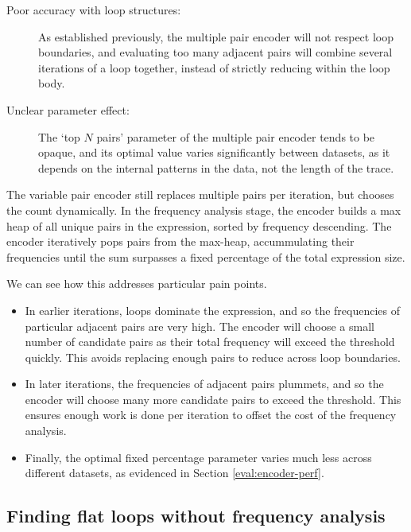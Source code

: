 \begin{description}
  \item[Poor accuracy with loop structures:] As established previously, the multiple pair encoder will not respect 
    loop boundaries, and evaluating too many adjacent pairs will combine several iterations of a loop together, instead 
    of strictly reducing within the loop body.
  \item [Unclear parameter effect:] The `top $N$ pairs' parameter of the multiple pair encoder tends to be opaque, and 
    its optimal value varies significantly between datasets, as it depends on the internal patterns in the data, not 
    the length of the trace.
\end{description}

The variable pair encoder still replaces multiple pairs per iteration, but chooses the count dynamically. In the 
frequency analysis stage, the encoder builds a max heap of all unique pairs in the expression, sorted by frequency 
descending. The encoder iteratively pops pairs from the max-heap, accummulating their frequencies until the sum 
surpasses a fixed percentage of the total expression size.

We can see how this addresses particular pain points.

\begin{itemize}
  \item In earlier iterations, loops dominate the expression, and so the frequencies of particular adjacent pairs are
    very high. The encoder will choose a small number of candidate pairs as their total frequency will exceed the
    threshold quickly. This avoids replacing enough pairs to reduce across loop boundaries.
  \item In later iterations, the frequencies of adjacent pairs plummets, and so the encoder will choose many more 
    candidate pairs to exceed the threshold. This ensures enough work is done per iteration to offset the cost of the 
    frequency analysis.
  \item Finally, the optimal fixed percentage parameter varies much less across different datasets, as evidenced in Section \ref{eval:encoder-perf}.
\end{itemize}

\subsection{Finding flat loops without frequency analysis} \label{impl:loop-finder}

